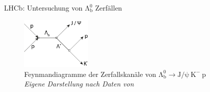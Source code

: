 \documentclass[aspectratio=169]{beamer} %
\begin{document}
\begin{frame}{LHCb: Untersuchung von $\mathrm{\Lambda_b^0}$ Zerfällen}
\begin{figure}
          \hspace{2cm}
          \includegraphics[width=0.3\textwidth]{FeynmanDiag/lambda.png}
          \caption{Feynmandiagramme der Zerfallskanäle von $\mathrm{\Lambda_b^0} \to \mathrm{J}/\mathrm{\psi}\:\mathrm{K}^-\:\mathrm{p}$\\\tiny \emph{Eigene Darstellung nach Daten von \textcite{Aaij.2015}}}
      \end{figure}
  \end{frame}
\end{document}
